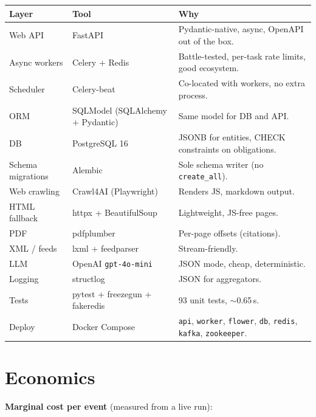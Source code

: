 \documentclass[11pt,a4paper]{article}
\begin{document}
\begin{center}
\small
\begin{tabularx}{\linewidth}{@{}lXl@{}}
\toprule
\textbf{Layer}    & \textbf{Tool}              & \textbf{Why} \\
\midrule
Web API           & FastAPI                    & Pydantic-native, async, OpenAPI out of the box. \\
Async workers     & Celery + Redis             & Battle-tested, per-task rate limits, good ecosystem. \\
Scheduler         & Celery-beat                & Co-located with workers, no extra process. \\
ORM               & SQLModel (SQLAlchemy + Pydantic) & Same model for DB and API. \\
DB                & PostgreSQL 16              & JSONB for entities, CHECK constraints on obligations. \\
Schema migrations & Alembic                    & Sole schema writer (no \texttt{create\_all}). \\
Web crawling      & Crawl4AI (Playwright)      & Renders JS, markdown output. \\
HTML fallback     & httpx + BeautifulSoup      & Lightweight, JS-free pages. \\
PDF               & pdfplumber                 & Per-page offsets (citations). \\
XML / feeds       & lxml + feedparser          & Stream-friendly. \\
LLM               & OpenAI \texttt{gpt-4o-mini} & JSON mode, cheap, deterministic. \\
Logging           & structlog                  & JSON for aggregators. \\
Tests             & pytest + freezegun + fakeredis & 93 unit tests, $\sim$0.65\,s. \\
Deploy            & Docker Compose             & \texttt{api}, \texttt{worker}, \texttt{flower}, \texttt{db}, \texttt{redis}, \texttt{kafka}, \texttt{zookeeper}. \\
\bottomrule
\end{tabularx}
\end{center}

\section{Economics}

\textbf{Marginal cost per event} (measured from a live run):
\end{document}
